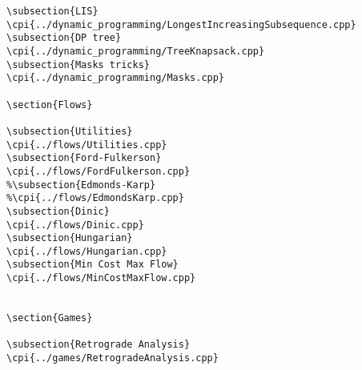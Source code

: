{\begin{verbatim}
\subsection{LIS}
\cpi{../dynamic_programming/LongestIncreasingSubsequence.cpp}
\subsection{DP tree}
\cpi{../dynamic_programming/TreeKnapsack.cpp}
\subsection{Masks tricks}
\cpi{../dynamic_programming/Masks.cpp}

\section{Flows}

\subsection{Utilities}
\cpi{../flows/Utilities.cpp}
\subsection{Ford-Fulkerson}
\cpi{../flows/FordFulkerson.cpp}
%\subsection{Edmonds-Karp}
%\cpi{../flows/EdmondsKarp.cpp}
\subsection{Dinic}
\cpi{../flows/Dinic.cpp}
\subsection{Hungarian}
\cpi{../flows/Hungarian.cpp}
\subsection{Min Cost Max Flow}
\cpi{../flows/MinCostMaxFlow.cpp}


\section{Games}

\subsection{Retrograde Analysis}
\cpi{../games/RetrogradeAnalysis.cpp}


\end{verbatim}}
